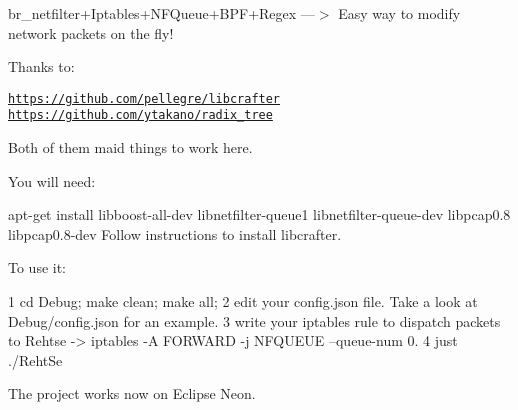 br\+\_\+netfilter+\+Iptables+\+N\+F\+Queue+\+B\+P\+F+\+Regex ---$>$ Easy way to modify network packets on the fly!

Thanks to\+:

\href{https://github.com/pellegre/libcrafter}{\tt https\+://github.\+com/pellegre/libcrafter} \href{https://github.com/ytakano/radix_tree}{\tt https\+://github.\+com/ytakano/radix\+\_\+tree}

Both of them maid things to work here.

You will need\+: \begin{DoxyVerb}apt-get install libboost-all-dev libnetfilter-queue1 libnetfilter-queue-dev libpcap0.8 libpcap0.8-dev
Follow instructions to install libcrafter. 
\end{DoxyVerb}


To use it\+: \begin{DoxyVerb}1 cd Debug; make clean; make all;
2 edit your config.json file. Take a look at Debug/config.json for an example.
3 write your iptables rule to dispatch packets to Rehtse -> iptables -A FORWARD -j NFQUEUE --queue-num 0.
4 just ./RehtSe
\end{DoxyVerb}


The project works now on Eclipse Neon. 